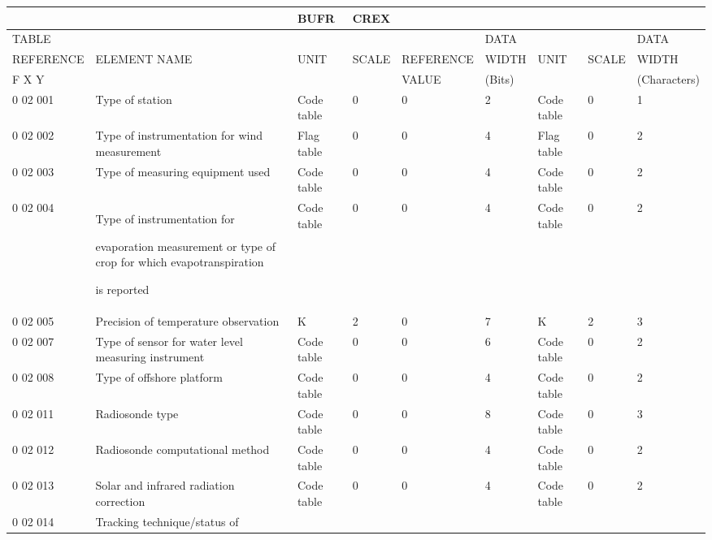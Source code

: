 \begin{longtable}[]{@{}lllllllll@{}}
\toprule
& & BUFR & CREX & & & & &\tabularnewline
\midrule
\endhead
TABLE & & & & & DATA & & & DATA\tabularnewline
REFERENCE & ELEMENT NAME & UNIT & SCALE & REFERENCE & WIDTH & UNIT & SCALE & WIDTH\tabularnewline
F X Y & & & & VALUE & (Bits) & & & (Characters)\tabularnewline
0 02 001 & Type of station & Code table & 0 & 0 & 2 & Code table & 0 & 1\tabularnewline
0 02 002 & Type of instrumentation for wind measurement & Flag table & 0 & 0 & 4 & Flag table & 0 & 2\tabularnewline
0 02 003 & Type of measuring equipment used & Code table & 0 & 0 & 4 & Code table & 0 & 2\tabularnewline
\begin{minipage}[t]{0.08\columnwidth}\raggedright
0 02 004\strut
\end{minipage} & \begin{minipage}[t]{0.08\columnwidth}\raggedright
Type of instrumentation for

evaporation measurement or type of crop for which evapotranspiration

is reported\strut
\end{minipage} & \begin{minipage}[t]{0.08\columnwidth}\raggedright
Code table\strut
\end{minipage} & \begin{minipage}[t]{0.08\columnwidth}\raggedright
0\strut
\end{minipage} & \begin{minipage}[t]{0.08\columnwidth}\raggedright
0\strut
\end{minipage} & \begin{minipage}[t]{0.08\columnwidth}\raggedright
4\strut
\end{minipage} & \begin{minipage}[t]{0.08\columnwidth}\raggedright
Code table\strut
\end{minipage} & \begin{minipage}[t]{0.08\columnwidth}\raggedright
0\strut
\end{minipage} & \begin{minipage}[t]{0.08\columnwidth}\raggedright
2\strut
\end{minipage}\tabularnewline
0 02 005 & Precision of temperature observation & K & 2 & 0 & 7 & K & 2 & 3\tabularnewline
0 02 007 & Type of sensor for water level measuring instrument & Code table & 0 & 0 & 6 & Code table & 0 & 2\tabularnewline
0 02 008 & Type of offshore platform & Code table & 0 & 0 & 4 & Code table & 0 & 2\tabularnewline
0 02 011 & Radiosonde type & Code table & 0 & 0 & 8 & Code table & 0 & 3\tabularnewline
0 02 012 & Radiosonde computational method & Code table & 0 & 0 & 4 & Code table & 0 & 2\tabularnewline
0 02 013 & Solar and infrared radiation correction & Code table & 0 & 0 & 4 & Code table & 0 & 2\tabularnewline
\begin{minipage}[t]{0.08\columnwidth}\raggedright
0 02 014\strut
\end{minipage} & \begin{minipage}[t]{0.08\columnwidth}\raggedright
Tracking technique/status of


\end{minipage}
\end{longtable}
